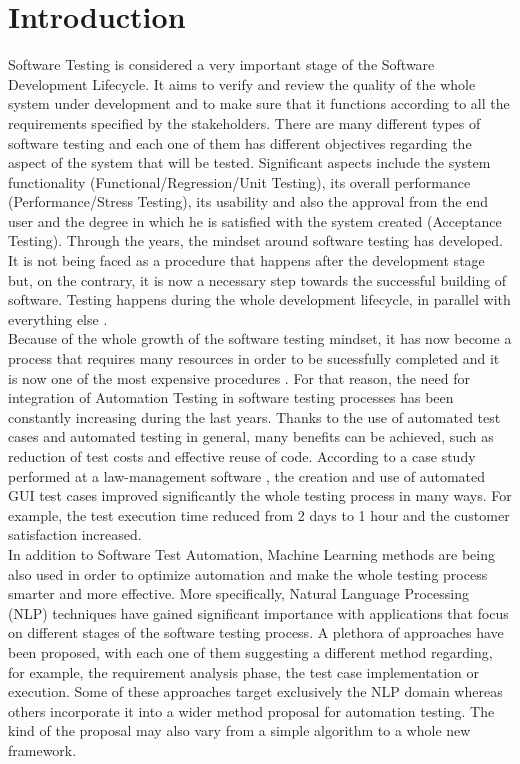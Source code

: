 \chapter*{Introduction}

Software Testing is considered a very important stage of the Software Development Lifecycle. It aims to verify and review the quality of the whole system 
under development and to make sure that it functions according to all the requirements specified by the stakeholders. There are many different types of software testing and each 
one of them has different objectives regarding the aspect of the system that will be tested. Significant aspects include the system functionality 
(Functional/Regression/Unit Testing), its overall performance (Performance/Stress Testing), its usability and also the approval from the end user and 
the degree in which he is satisfied with the system created (Acceptance Testing). Through the years, the mindset around software testing 
has developed. It is not being faced as a procedure that happens after the development stage but, on the contrary, it is now a necessary 
step towards the successful building of software. Testing happens during the whole development lifecycle, in parallel with everything else \cite{swebok}.  \\

Because of the whole growth of the software testing mindset, it has now become a process that requires many resources in order to be sucessfully
 completed and it is now one of the most expensive procedures \cite{testautomation}. For that reason, the need for integration of Automation Testing in software testing
  processes has been constantly increasing during the last years. Thanks to the use of automated test cases and automated testing in general, many benefits can be achieved, such 
  as reduction of test costs and effective reuse of code. According to a case study performed at a law-management software \cite{introautotesting}, the creation and
   use of automated GUI test cases improved significantly the whole testing process in many ways. For example, the test execution time reduced from 2 days to 1 hour and the 
   customer satisfaction increased. \\

In addition to Software Test Automation, Machine Learning methods are being also used in order to optimize automation and make the whole testing process smarter and more 
effective. More specifically, Natural Language Processing (NLP) techniques have gained significant importance with applications that focus on different stages of the software testing process. 
A plethora of approaches have been proposed, with each one of them suggesting a different method regarding, for example, the requirement analysis phase, the test case implementation or execution. 
Some of these approaches target exclusively the NLP domain whereas others incorporate it into a wider method proposal for automation testing. The kind of the proposal may also vary from a simple 
algorithm to a whole new framework. \\

